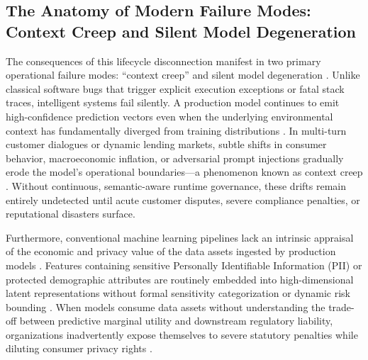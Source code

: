 \documentclass[journal]{IEEEtran}
\begin{document}
\subsection{The Anatomy of Modern Failure Modes: Context Creep and Silent Model Degeneration}
The consequences of this lifecycle disconnection manifest in two primary operational failure modes: ``context creep'' and silent model degeneration \cite{gama2014survey, lu2018learning}. Unlike classical software bugs that trigger explicit execution exceptions or fatal stack traces, intelligent systems fail silently. A production model continues to emit high-confidence prediction vectors even when the underlying environmental context has fundamentally diverged from training distributions \cite{rabanser2019failing, baier2019handling}. In multi-turn customer dialogues or dynamic lending markets, subtle shifts in consumer behavior, macroeconomic inflation, or adversarial prompt injections gradually erode the model's operational boundaries---a phenomenon known as context creep \cite{rebedea2023nemo, dong2023guardrails}. Without continuous, semantic-aware runtime governance, these drifts remain entirely undetected until acute customer disputes, severe compliance penalties, or reputational disasters surface.

Furthermore, conventional machine learning pipelines lack an intrinsic appraisal of the economic and privacy value of the data assets ingested by production models \cite{ghorbani2019data, chen2022data}. Features containing sensitive Personally Identifiable Information (PII) or protected demographic attributes are routinely embedded into high-dimensional latent representations without formal sensitivity categorization or dynamic risk bounding \cite{micheli2020emerging, gebru2021datasheets}. When models consume data assets without understanding the trade-off between predictive marginal utility and downstream regulatory liability, organizations inadvertently expose themselves to severe statutory penalties while diluting consumer privacy rights \cite{eu_ai_act2024, nist_ai_rmf2023}.
\end{document}
